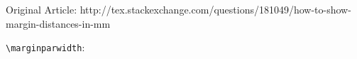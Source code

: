 \documentclass[12pt,a4paper]{article}
\begin{document}
\par Original Article: 
http://tex.stackexchange.com/questions/181049/how-to-show-margin-distances-in-mm

\par
{}

\verb|\marginparwidth|: \prntlen{\marginparwidth}

\pagediagram
\end{document}

